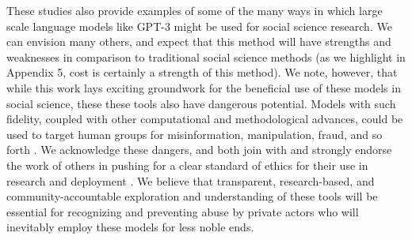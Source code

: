 \documentclass[11pt]{article}
\begin{document}
These studies also provide examples of some of the many ways in which large scale language models like GPT-3 might be used for social science research. We can envision many others, and expect that this method will have strengths and weaknesses in comparison to traditional social science methods (as we highlight in Appendix 5, cost is certainly a strength of this method). We note, however, that while this work lays exciting groundwork for the beneficial use of these models in social science, these these tools also have dangerous potential. Models with such fidelity, coupled with other computational and methodological advances, could be used to target human groups for misinformation, manipulation, fraud, and so forth \citep{brown2020language}. We acknowledge these dangers, and both join with and strongly endorse the work of others in pushing for a clear standard of ethics for their use in research and deployment \citep{ross2012guide, salganik_bit_2017}. We believe that transparent, research-based, and community-accountable exploration and understanding of these tools will be essential for recognizing and preventing abuse by private actors who will inevitably employ these models for less noble ends.


\end{document}
